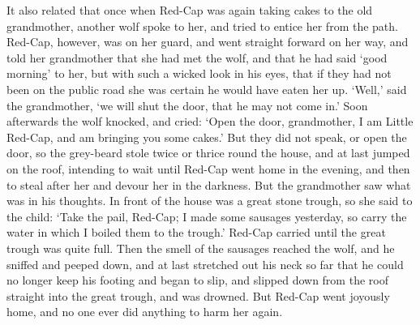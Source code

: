 It also related that once when Red-Cap was again taking cakes to the old grandmother, another wolf spoke to her, and tried to entice her from the path. Red-Cap, however, was on her guard, and went straight forward on her way, and told her grandmother that she had met the wolf, and that he had said `good morning' to her, but with such a wicked look in his eyes, that if they had not been on the public road she was certain he would have eaten her up. `Well,' said the grandmother, `we will shut the door, that he may not come in.' Soon afterwards the wolf knocked, and cried: `Open the door, grandmother, I am Little Red-Cap, and am bringing you some cakes.' But they did not speak, or open the door, so the grey-beard stole twice or thrice round the house, and at last jumped on the roof, intending to wait until Red-Cap went home in the evening, and then to steal after her and devour her in the darkness. But the grandmother saw what was in his thoughts. In front of the house was a great stone trough, so she said to the child: `Take the pail, Red-Cap; I made some sausages yesterday, so carry the water in which I boiled them to the trough.' Red-Cap carried until the great trough was quite full. Then the smell of the sausages reached the wolf, and he sniffed and peeped down, and at last stretched out his neck so far that he could no longer keep his footing and began to slip, and slipped down from the roof straight into the great trough, and was drowned. But Red-Cap went joyously home, and no one ever did anything to harm her again.
